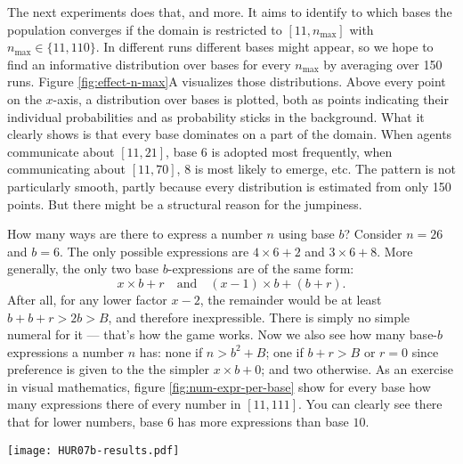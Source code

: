 \documentclass{../src/bcthesispart}
\begin{document}
The next experiments does that, and more.
It aims to identify to which bases the population converges if the domain is restricted to $[11, n_{\text{max}}]$ with $n_{\text{max}} \in \{11, 110\}$.
In different runs different bases might appear, so we hope to find an informative distribution over bases for every $n_{\text{max}}$ by averaging over 150 runs.
Figure \ref{fig:effect-n-max}A visualizes those distributions.
Above every point on the $x$-axis, a distribution over bases is plotted, both as points indicating their individual probabilities and as probability sticks in the background.
What it clearly shows is that every base dominates on a part of the domain. 
When agents communicate about $[11,21]$, base $6$ is adopted most frequently, when communicating about $[11,70]$, $8$ is most likely to emerge, etc.
The pattern is not particularly smooth, partly because every distribution is estimated from only 150 points.
But there might be a structural reason for the jumpiness.

How many ways are there to express a number $n$ using base $b$?
Consider $n=26$ and $b=6$.
The only possible expressions are $4 \times 6 +2$ and $3\times 6 + 8$. 
More generally, the only two base $b$-expressions are of the same form:
\[
	x\times b+r \quad \text{and} \quad (x-1) \times b + (b+r).
\]
After all, for any lower factor $x-2$, the remainder would be at least $b+b+r > 2b > B$, and therefore inexpressible. 
There is simply no simple numeral for it — that's how the game works.
Now we also see how many base-$b$ expressions a number $n$ has: none if $n > b^2+B$; one if $b+r > B$ or $r = 0$ since preference is given to the the simpler $x\times b + 0$; and two otherwise. 
As an exercise in visual mathematics, figure \ref{fig:num-expr-per-base} show for every base how many expressions there of every number in $[11, 111]$. 
You can clearly see there that for lower numbers, base $6$ has more expressions than base $10$. 

\begin{SCfigure}
	\texttt{[image: HUR07b-results.pdf]}
	\caption{The number of expressions of a number $n$ per base $b$.
	\label{fig:num-expr-per-base}}
\end{SCfigure}
\end{document}
